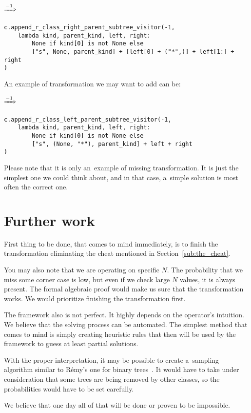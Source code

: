 \documentclass[final]{article}
\theoremstyle{definition}
\theoremstyle{definition}
\theoremstyle{remark}
\newcommand{\includeinlinescaledsvg}[3]{\begin{minipage}{#1\textwidth}\begin{center}\end{center}\end{minipage}}
\begin{document}
\begin{center}
    \includeinlinescaledsvg{.4}{.7}{lambda__transformations__013a}%
    \(\xRightarrow{-1}\)%
    \includeinlinescaledsvg{.4}{.7}{lambda__transformations__013b}%
\end{center}

\begin{lstlisting}
c.append_r_class_right_parent_subtree_visitor(-1,
    lambda kind, parent_kind, left, right:
        None if kind[0] is not None else
        ["s", None, parent_kind] + [left[0] + ("*",)] + left[1:] + right
)
\end{lstlisting}

An example of transformation we may want to add can be:

\begin{center}
    \includeinlinescaledsvg{.4}{.7}{lambda__transformations__014a}%
    \(\xRightarrow{-1}\)%
    \includeinlinescaledsvg{.4}{.7}{lambda__transformations__014b}%
\end{center}

\begin{lstlisting}
c.append_r_class_left_parent_subtree_visitor(-1,
    lambda kind, parent_kind, left, right:
        None if kind[0] is not None else
        ["s", (None, "*"), parent_kind] + left + right
)
\end{lstlisting}

Please note that it is only an~example of missing transformation. It is just the simplest one we could think about, and in that case, a~simple solution is most often the correct one.

\section{Further work}%
\label{sec:further_work}

First thing to be done, that comes to mind immediately, is to finish the transformation eliminating the cheat mentioned in Section~\ref{sub:the_cheat}.

You may also note that we are operating on specific \(N\). The probability that we miss some corner case is low, but even if we check large \(N\) values, it is always present. The formal algebraic proof would make us sure that the transformation works. We would prioritize finishing the transformation first.

The framework also is not perfect. It highly depends on the operator's intuition. We believe that the solving process can be automated. The simplest method that comes to mind is simply creating heuristic rules that then will be used by the framework to guess at least partial solutions.

With the proper interpretation, it may be possible to create a~sampling algorithm similar to Rémy's one for binary trees~\cite{remy,note}. It would have to take under consideration that some trees are being removed by other classes, so the probabilities would have to be set carefully.

We believe that one day all of that will be done or proven to be impossible.

\clearpage

\printbibliography%
\end{document}
